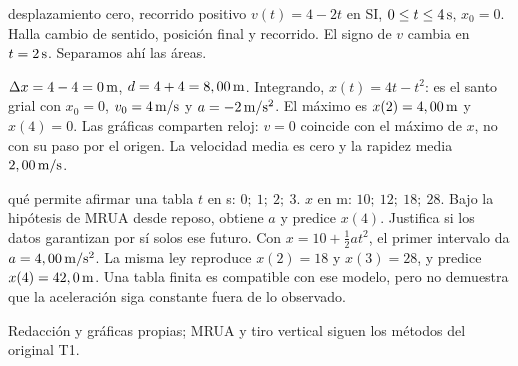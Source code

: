 \documentclass[11pt,a4paper]{article}
\begin{document}
\begin{examplebox}{desplazamiento cero, recorrido positivo}
 $v(t)=4-2t$ en SI, $0\le t\le4\,\mathrm{s}$, $x_0=0$.
Halla cambio de sentido, posici\'on final y recorrido.
\solutionblock
{} El signo de $v$ cambia en $t=2\,\mathrm{s}$. Separamos ah\'i las \'areas.
\begin{center}
\end{center}
$\Delta x=4-4=0\,\mathrm{m}$, $d=4+4=8,00\,\mathrm{m}$.
Integrando, $x(t)=4t-t^2$: es el santo grial con $x_0=0$, $v_0=4\,\mathrm{m/s}$ y $a=-2\,\mathrm{m/s^2}$.
El m\'aximo es $x(2)=4,00\,\mathrm{m}$ y $x(4)=0$.
 Las gr\'aficas comparten reloj: $v=0$ coincide con el
m\'aximo de $x$, no con su paso por el origen. La velocidad media es cero y la rapidez
media $2,00\,\mathrm{m/s}$.
\end{examplebox}

\begin{exercisebox}{qu\'e permite afirmar una tabla}
$t$ en s: $0;\ 1;\ 2;\ 3$.
$x$ en m: $10;\ 12;\ 18;\ 28$.
Bajo la hip\'otesis de MRUA desde reposo, obtiene $a$ y predice $x(4)$.
Justifica si los datos garantizan por s\'i solos ese futuro.
\solutionblock
Con $x=10+\tfrac12at^2$, el primer intervalo da $a=4,00\,\mathrm{m/s^2}$.
La misma ley reproduce $x(2)=18$ y $x(3)=28$, y predice
$x(4)=42,0\,\mathrm{m}$. Una tabla finita es compatible con ese modelo,
pero no demuestra que la aceleraci\'on siga constante fuera de lo observado.
\end{exercisebox}

Redacci\'on y gr\'aficas propias; MRUA y tiro vertical siguen los m\'etodos del original T1.
\end{document}

